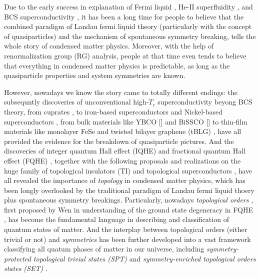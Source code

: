 

Due to the early success in explanation of Fermi liquid \cite{landau1959theory}, He-II superfluidity \cite{landau1941theory}, and BCS superconductivity \cite{bardeen1957theory,bardeen1957microscopic}, it has been a long time for people to believe that the combined paradigm of Landau fermi liquid theory (particularly with the concept of quasiparticles) and the mechanism of spontaneous symmetry breaking, tells the whole story of condensed matter physics. Moreover, with the help of renormalization group (RG) analysis, people at that time even tends to believe that everything in condensed matter physics is predictable, as long as the quasiparticle properties and system symmetries are known.

However, nowadays we know the story came to totally different endings: the subsequntly discoveries of unconventional high-$T_c$ superconductivity beyong BCS theory, from cuprates \cite{bednorz1986possible}, to iron-based superconductors \cite{kamihara2006iron} and Nickel-based superconductors \cite{li2019superconductivity}, from bulk materials like YBCO [] and BiSSCO [] to thin-film materials like monolayer FeSe \cite{liu2012electronic} and twisted bilayer graphene (tBLG) \cite{cao2018correlated,cao2018unconventional}, have all provided the evidence for the breakdown of quasiparticle pictures. And the discoveries of integer quantum Hall effect (IQHE) \cite{klitzing1980new} and fractional quantum Hall effect (FQHE) \cite{tsui1982two,willett1987observation}, together with the following proposals and realizations on the huge family of topological insulators (TI) \cite{bernevig2006quantum,hsieh2008topological} and topological superconductors \cite{xu2014artificial}, have all revealed the importance of \emph{topology} in condensed matter physics, which has been longly overlooked by the traditional paradigm of Landau fermi liquid thoery plus spontaneous symmetry breakings. Particularly, nowadays \emph{topological orders} \cite{wen1990topological,levin2005string,chen2010local,wen2002quantum}, first proposed by Wen in understanding of the ground state degeneracy in FQHE \cite{wen1990ground}, has become the fundamental language in describing and classification of quantum states of matter. And the interplay between topological orders (either trivial or not) and \emph{symmetries} has been further developed into a vast framework classifying all quatum phases of matter in our universe, including \emph{symmetry-protected topological trivial states (SPT)} \cite{chen2013symmetry} and \emph{symmetry-enriched topological orders states (SET)} \cite{mesaros2013classification}.


